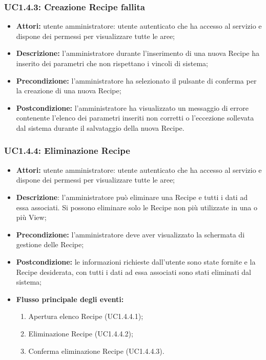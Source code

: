 \subsubsection{UC1.4.3: Creazione Recipe fallita}

\begin{itemize}
  	\item \textbf{Attori:} utente amministratore: utente autenticato che ha accesso al servizio e dispone dei permessi per visualizzare tutte le aree;
    \item \textbf{Descrizione:} l'amministratore durante l'inserimento di una nuova Recipe\gloss{} ha inserito dei parametri che non rispettano i vincoli di sistema;
    \item \textbf{Precondizione:} l'amministratore ha selezionato il pulsante di conferma per la creazione di una nuova Recipe\gloss{};
    \item \textbf{Postcondizione:} l'amministratore ha visualizzato un messaggio di errore contenente l'elenco dei parametri inseriti non corretti o l'eccezione sollevata dal sistema durante il salvataggio della nuova Recipe\gloss{}.
\end{itemize}

\subsubsection{UC1.4.4: Eliminazione Recipe}

\begin{itemize}
  	\item \textbf{Attori:} utente amministratore: utente autenticato che ha accesso al servizio e dispone dei permessi per visualizzare tutte le aree;
    \item \textbf{Descrizione}: l'amministratore può eliminare una Recipe\gloss{} e tutti i dati ad essa associati.
    Si possono eliminare solo le Recipe\gloss{} non più utilizzate in una o più View\gloss{};
    \item \textbf{Precondizione:} l'amministratore deve aver visualizzato la schermata di gestione delle Recipe\gloss{};
    \item \textbf{Postcondizione:} le informazioni richieste dall'utente sono state fornite e la Recipe\gloss{} desiderata, con tutti i dati ad essa associati sono stati eliminati dal sistema;
    \item \textbf{Flusso principale degli eventi:}
    \begin{enumerate}
        \item Apertura elenco Recipe\gloss{} (UC1.4.4.1);
        \item Eliminazione Recipe\gloss{} (UC1.4.4.2);
        \item Conferma eliminazione Recipe\gloss{} (UC1.4.4.3).
    \end{enumerate}
\end{itemize}


